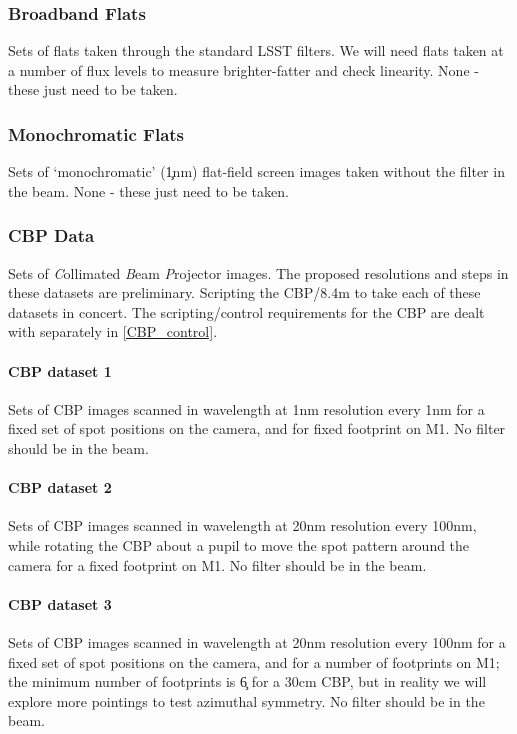 \subsubsection{Broadband Flats}\label{sec:calibInputs:broadFlat}
Sets of flats taken through the standard LSST filters.  We will	need flats taken at a number of flux levels to measure brighter-fatter and check linearity.
\alg None - these just need to be taken.


\subsubsection{Monochromatic Flats}\label{sec:calibInputs:monoFlat}
Sets of `monochromatic' (\c 1nm) flat-field screen images taken without the filter in the beam.
\alg None - these just need to be taken.


\subsubsection{CBP Data}\label{sec:calibInputs:CBP}
Sets of \textit{C}ollimated \textit{B}eam \textit{P}rojector images. The proposed resolutions and steps in these datasets are preliminary.
\alg Scripting the CBP/8.4m to take each of these datasets in concert. The scripting/control requirements for the CBP are dealt with separately in \ref{CBP_control}.


\paragraph{CBP dataset 1}\label{sec:calibInputs:CBP:mono}
Sets of CBP images scanned in wavelength at 1nm resolution every 1nm for a fixed set of spot positions on the camera, and for fixed footprint on M1.  No filter should be in the beam.
	
	
\paragraph{CBP dataset 2}\label{sec:calibInputs:CBP:spot}
Sets of CBP images scanned in wavelength at 20nm resolution every 100nm, while rotating the CBP about a pupil to move the spot pattern around the camera for a fixed footprint on M1.  No filter should be in the beam.

	
\paragraph{CBP dataset 3}\label{sec:calibInputs:CBP:M1}
Sets of CBP images scanned in wavelength at 20nm resolution every 100nm for a fixed set of spot positions on the camera, and for a number of footprints on M1; the minimum number of footprints is \c 6 for a 30cm CBP, but in reality we will explore more pointings to test azimuthal symmetry. No filter should be in the beam.


